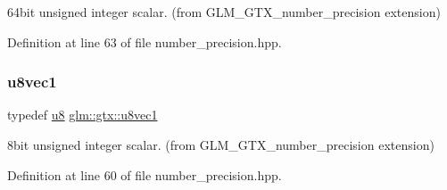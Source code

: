 64bit unsigned integer scalar. (from G\+L\+M\+\_\+\+G\+T\+X\+\_\+number\+\_\+precision extension) 



Definition at line 63 of file number\+\_\+precision.\+hpp.

\mbox{\label{group__gtx__number__precision_ga35ae7849593a354420e4f52d1b36c2d6}} 
\subsubsection{\texorpdfstring{u8vec1}{u8vec1}}
{\footnotesize\ttfamily typedef \hyperlink{group__gtc__type__precision_ga5e3dc67373d5068997d2d9f41c9024d2}{u8} \hyperlink{group__gtx__number__precision_ga35ae7849593a354420e4f52d1b36c2d6}{glm\+::gtx\+::u8vec1}}



8bit unsigned integer scalar. (from G\+L\+M\+\_\+\+G\+T\+X\+\_\+number\+\_\+precision extension) 



Definition at line 60 of file number\+\_\+precision.\+hpp.

